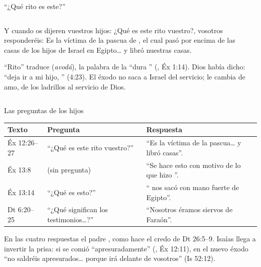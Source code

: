\begin{frame}{``¿Qué rito es este?''}
\begin{columns}[c,onlytextwidth]
\begin{column}{0.57\textwidth}
\begin{cita}Y cuando os dijeren vuestros hijos: ¿Qué es este rito vuestro?, vosotros responderéis: Es la víctima de la pascua de \SENOR, el cual pasó por encima de las casas de los hijos de Israel en Egipto\ldots{} y libró nuestras casas.\end{cita}
\scriptsize\RaggedRight ``Rito'' traduce  (\emph{avodá}), la palabra de la ``dura '' (, Éx 1:14). Dios había dicho: ``deja ir a mi hijo, '' (4:23). El éxodo no saca a Israel del servicio; le cambia de amo, de los ladrillos al servicio de Dios.
\end{column}
\begin{column}{0.41\textwidth}\end{column}
\end{columns}
\end{frame}

\begin{frame}{Las preguntas de los hijos}
\scriptsize\renewcommand{\arraystretch}{1.14}
\begin{tabular}{@{}L{1.9cm}L{3.4cm}L{6.8cm}@{}}
\toprule
\textbf{Texto} & \textbf{Pregunta} & \textbf{Respuesta} \\ \midrule
Éx 12:26--27 & ``¿Qué es este rito vuestro?'' & ``Es la víctima de la pascua\ldots{} y libró  casas''. \\
Éx 13:8 & (sin pregunta) & ``Se hace esto con motivo de lo que \SENOR{} hizo ''. \\
Éx 13:14 & ``¿Qué es esto?'' & ``\SENOR{} nos sacó con mano fuerte de Egipto''. \\
Dt 6:20--25 & ``¿Qué significan los testimonios\ldots?'' & ``Nosotros éramos siervos de Faraón''. \\
\bottomrule
\end{tabular}\par\medskip
\small\RaggedRight En las cuatro respuestas el padre , como hace el credo de Dt 26:5--9. Isaías llega a invertir la prisa: si se comió ``apresuradamente'' (, Éx 12:11), en el nuevo éxodo ``no saldréis apresurados\ldots{} porque \SENOR{} irá delante de vosotros'' (Is 52:12).
\end{frame}

